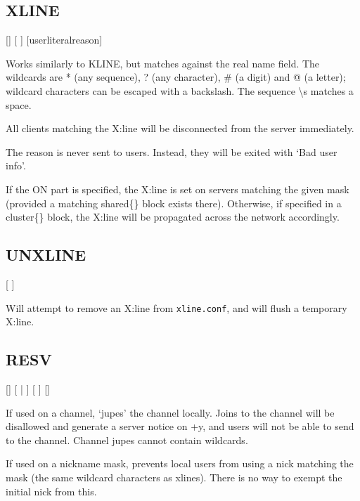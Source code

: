 \subsection{XLINE}
\label{XLINES}

    [] 
    [ ]
    [\literal{:}userliteral{reason}]

	Works similarly to KLINE, but matches against the real name field. The
	wildcards are * (any sequence), ? (any character), \# (a digit) and @
	(a letter); wildcard characters can be escaped with a backslash. The
	sequence \textbackslash{}s matches a space.

	All clients matching the X:line will be disconnected from the server
	immediately.

	The reason is never sent to users. Instead, they will be exited with
	`Bad user info'.

	If the ON part is specified, the X:line is set on servers matching the
	given mask (provided a matching shared\{\} block exists there).
	Otherwise, if specified in a cluster\{\} block, the X:line will be
	propagated across the network accordingly.


\subsection{UNXLINE}

     [ ]

	Will attempt to remove an X:line from \nolinkurl{xline.conf}, and will
	flush a temporary X:line.


\subsection{RESV}

    [] [ | ]
    [ ] [\literal{:}]

	If used on a channel, `jupes' the channel locally. Joins to the
	channel will be disallowed and generate a server notice on +y, and
	users will not be able to send to the channel. Channel jupes cannot
	contain wildcards.

	If used on a nickname mask, prevents local users from using a nick
	matching the mask (the same wildcard characters as xlines). There is
	no way to exempt the initial nick from this.

